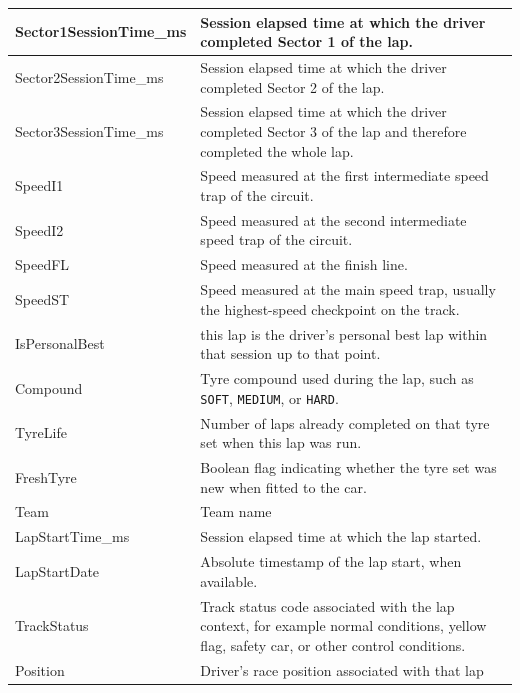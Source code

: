 \documentclass[a4paper,11pt]{article}
\begin{document}
\begin{longtable}{|p{4cm}|p{10.8cm}|}
		Sector1SessionTime\_ms & Session elapsed time at which the driver completed Sector 1 of the lap. \\ \hline
		Sector2SessionTime\_ms & Session elapsed time at which the driver completed Sector 2 of the lap. \\ \hline
		Sector3SessionTime\_ms & Session elapsed time at which the driver completed Sector 3 of the lap and therefore completed the whole lap. \\ \hline
		
		SpeedI1 & Speed measured at the first intermediate speed trap of the circuit. \\ \hline
		SpeedI2 & Speed measured at the second intermediate speed trap of the circuit. \\ \hline
		SpeedFL & Speed measured at the finish line. \\ \hline
		SpeedST & Speed measured at the main speed trap, usually the highest-speed checkpoint on the track. \\ \hline
		
		
		IsPersonalBest & this lap is the driver's personal best lap within that session up to that point. \\ \hline
		
		
		Compound & Tyre compound used during the lap, such as \texttt{SOFT}, \texttt{MEDIUM}, or \texttt{HARD}. \\ \hline
		
		TyreLife & Number of laps already completed on that tyre set when this lap was run. \\ \hline
		
		FreshTyre & Boolean flag indicating whether the tyre set was new when fitted to the car. \\ \hline
		
		
		Team & Team name  \\ \hline
		
		LapStartTime\_ms & Session elapsed time at which the lap started. \\ \hline
		LapStartDate & Absolute timestamp of the lap start, when available. \\ \hline
		
		TrackStatus & Track status code associated with the lap context, for example normal conditions, yellow flag, safety car, or other control conditions. \\ \hline
		
		
		Position & Driver's race position associated with that lap \\ \hline
		

\end{longtable}
\end{document}
